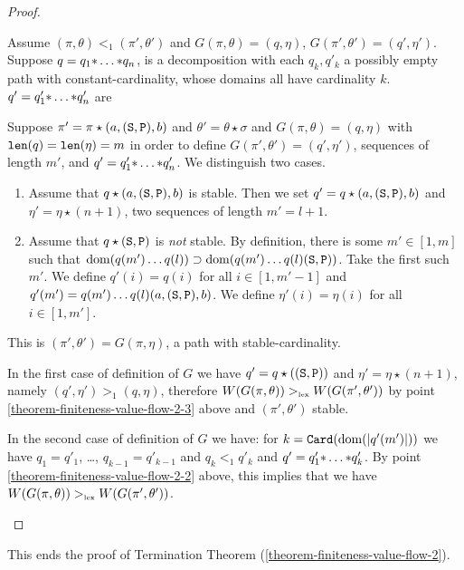 \documentclass{lmcs}
\begin{document}
\begin{proof}
\begin{enumerate}

Assume $(\pi,\theta) <_1 (\pi',\theta')$ and  $G(\pi,\theta) = (q,\eta)$, 
$G(\pi',\theta') = (q',\eta')$. Suppose $q= q_1 {*} \ldots {*} q_n$,
is a decomposition with each $q_k, q'_k$
a possibly empty path  with constant-cardinality, 
whose domains all have cardinality $k$.
$q' = q'_1 {*} \ldots {*} q'_n$ are 

Suppose $\pi' = \pi \star (a,({\tt S},{\tt P}),b)$ and $\theta' = \theta \star \sigma$
and $G(\pi,\theta) = (q,\eta)$ with ${\mbox{\tt len}}(q) = {\mbox{\tt len}}(\eta) = m$ in order to
define $G(\pi',\theta') = (q',\eta')$, sequences of length $m'$,
and $q' = q'_1 {*} \ldots {*} q'_n$. 
We distinguish two cases.

\begin{enumerate}
\item
Assume that $q \star (a,({\tt S},{\tt P}),b)$ is stable. 
Then we set $q' = q \star (a,({\tt S},{\tt P}),b)$ and $\eta' = \eta \star (n+1)$,
two sequences of length $m' = l+1$. 

\item
Assume that $q \star ({\tt S},{\tt P})$ is \emph{not} stable. 
By definition, there is some $m' \in[1,m]$ such that 
$
{\rm dom}(q(m') \ldots q(l))
\supset 
{\rm dom}(q(m') \ldots q(l) ({\tt S},{\tt P}))
$. Take the first such $m'$.
We define $q'(i) =  q(i)$ for all $i \in [1,m'-1]$ and
$q'(m') = q(m') \ldots q(l)  (a,({\tt S},{\tt P}),b)$.
We define $\eta'(i) = \eta(i)$ for all $i \in [1,m']$. 
\end{enumerate}
This is $(\pi',\theta')=G(\pi,\eta)$, a path with stable-cardinality. 

In the first case of definition of $G$ we have 
$q' = q \star (({\tt S},{\tt P}))$ and $\eta' = \eta \star (n+1)$, namely
$(q',\eta') >_1 (q,\eta)$, therefore $W(G(\pi,\theta)) >_{\mbox{\tiny lex}} W(G(\pi',\theta'))$
by point \ref{theorem-finiteness-value-flow-2-3} 
above and $(\pi',\theta')$ stable.

In the second case of definition of $G$ we have: 
for $k = {\tt Card}({\rm dom}({| q'(m') |}))$ we have 
$q_1 = q'_1$, \ldots, $q_{k-1} = q'_{k-1}$ and $q_k <_1 q'_k$ and 
$q' = q'_1 {*} \ldots {*} q'_k$. By point \ref{theorem-finiteness-value-flow-2-2} above, 
this implies that we have $W(G(\pi,\theta)) >_{\mbox{\tiny lex}} W(G(\pi',\theta'))$.

\end{enumerate}
\end{proof}

This ends the proof of Termination Theorem 
(\ref{theorem-finiteness-value-flow-2}).
\end{document}
